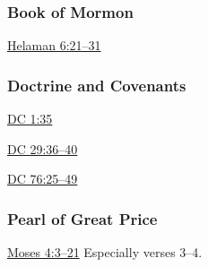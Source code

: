	\subsubsection{Book of Mormon} %
		\label{SATAN-BOM}
	
		
		\begin{compactdesc}
			\item[{\hyperref[HELAMAN-6-21]{Helaman 6:21--31}}]
		\end{compactdesc}
		
	\subsubsection{Doctrine and Covenants} %
		\label{SATAN-DC}
	
		
		\begin{compactdesc}
			\item[{\hyperref[DC1-35]{DC 1:35}}] 
			\item[{\hyperref[DC29-36]{DC 29:36--40}}] 
			\item[{\hyperref[DC76-25]{DC 76:25--49}}]
		\end{compactdesc}
		
	\subsubsection{Pearl of Great Price} %
		\label{SATAN-PGP}
	
		
		\begin{compactdesc}
			\item[{\hyperref[MOSES-4-3]{Moses 4:3--21}}] Especially verses 3--4.
		\end{compactdesc}
		

